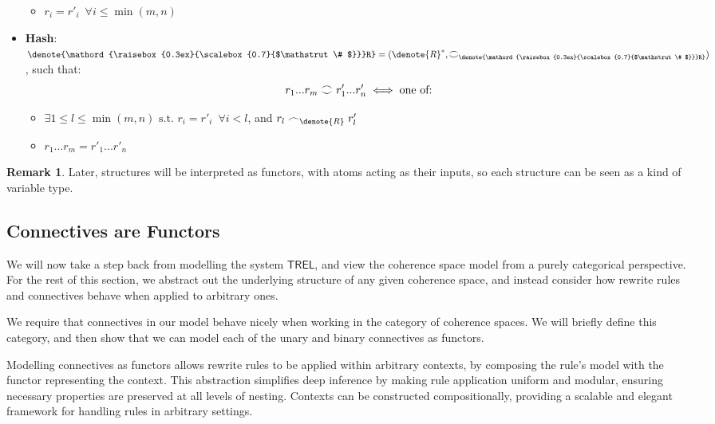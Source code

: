 \documentclass[11pt, oneside]{article}
\theoremstyle{plain}
\theoremstyle{definition}
\newtheorem*{remark}{Remark}
\newcommand{\hash}{\mathord{\raisebox{0.3ex}{\scalebox{0.7}{$\mathstrut \# $}}}}
\DeclarePairedDelimiter\denote\llbracket\rrbracket
\newcommand{\sSys}{{\mathsf{TREL}}}%
\newcommand{\coh}[1][]{\mathrel{\vcenter{\offinterlineskip\hbox{$\frown$}\vskip0.2ex\hbox{$\smile$}}_{\ifx\\#1\\\else#1\fi}}}
\newcommand{\scoh}[1][]{\mathrel{\frown}_{\ifx\\#1\\\else#1\fi}}
\begin{document}
\begin{itemize}
\begin{itemize}
    \item
    $r_i = r'_i \enspace\forall i\le\min(m,n)$
\end{itemize}

\item
\textbf{Hash}: $\denote{\hash R} = (\denote{R}^*, \coh[\denote{\hash R}])$, such that:
$$r_1...r_m \coh r'_1...r'_n \iff \text{one of:}$$

\begin{itemize}
    \item
    $\exists 1\leq l \leq \min(m,n) \text{ s.t. } r_i=r'_i \enspace\forall i<l$, and $r_l \scoh[\denote{R}] r'_l$

    \item
    $r_1...r_m = r'_1...r'_n$
\end{itemize}

\end{itemize}

\begin{remark}
    Later, structures will be interpreted as functors, with atoms acting as their inputs, so each structure can be seen as a kind of variable type.
\end{remark}

\subsection{Connectives are Functors}

We will now take a step back from modelling the system $\sSys$, and view the coherence space model from a purely categorical perspective.
For the rest of this section, we abstract out the underlying structure of any given coherence space, and instead consider how rewrite rules and connectives behave when applied to arbitrary ones.

We require that connectives in our model behave nicely when working in the category of coherence spaces.
We will briefly define this category, and then show that we can model each of the unary and binary connectives as functors.

Modelling connectives as functors allows rewrite rules to be applied within arbitrary contexts, by composing the rule's model with the functor representing the context.
This abstraction simplifies deep inference by making rule application uniform and modular, ensuring necessary properties are preserved at all levels of nesting.
Contexts can be constructed compositionally, providing a scalable and elegant framework for handling rules in arbitrary settings.
\end{document}
